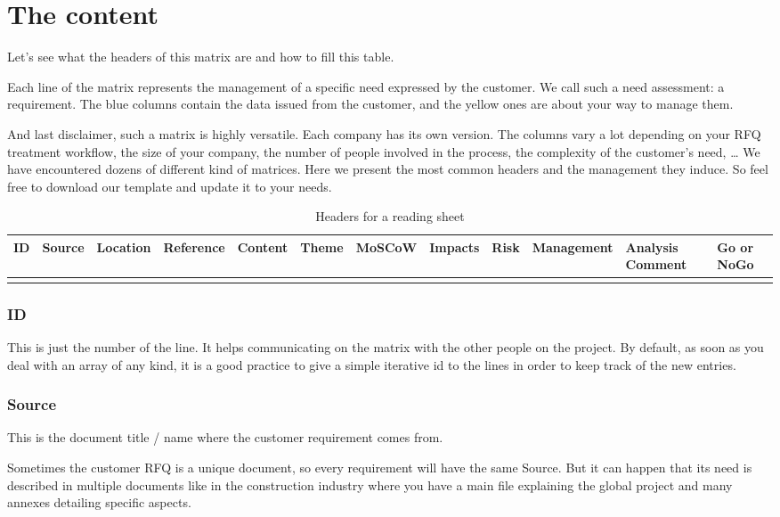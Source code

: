 \section{The content}

Let’s see what the headers of this matrix are and how to fill this table.

Each line of the matrix represents the management of a specific need expressed by the customer. We call such a need assessment: a requirement. The blue columns contain the data issued from the customer, and the yellow ones are about your way to manage them.

And last disclaimer, such a matrix is highly versatile. Each company has its own version. The columns vary a lot depending on your RFQ treatment workflow, the size of your company, the number of people involved in the process, the complexity of the customer’s need, … We have encountered dozens of different kind of matrices. Here we present the most common headers and the management they induce. So feel free to download our template and update it to your needs.

\begin{table*}[h]
	\centering
		\begin{tabular}{|c|c|c|c|c|c|c|c|c|c|}
			\hline
			ID & Source & Location & Reference & Content & Theme & MoSCoW & Impacts & Risk & Management & Analysis Comment & Go or NoGo \\ 
			\hline
			&&&&&&&&&\\
		\end{tabular}
	\caption{Headers for a reading sheet}
	\label{tab:HeaderRS}
\end{table*}

\subsubsection{ID}
This is just the number of the line. It helps communicating on the matrix with the other people on the project. By default, as soon as you deal with an array of any kind, it is a good practice to give a simple iterative id to the lines in order to keep track of the new entries.

\subsubsection{Source}
This is the document title / name where the customer requirement comes from.

Sometimes the customer RFQ is a unique document, so every requirement will have the same Source. But it can happen that its need is described in multiple documents like in the construction industry where you have a main file explaining the global project and many annexes detailing specific aspects.

